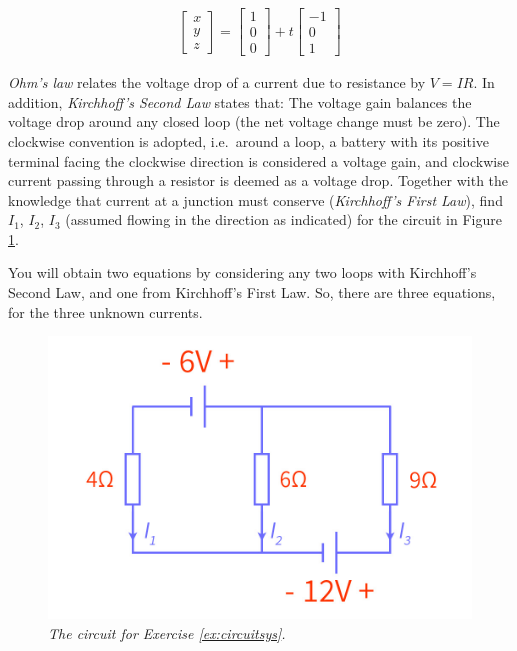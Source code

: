 \begin{Answer}
\begin{align*}
\begin{bmatrix}
x \\
y \\
z 
\end{bmatrix}
=
\begin{bmatrix}
1 \\
0 \\
0
\end{bmatrix}
+
t
\begin{bmatrix}
-1 \\
0 \\
1
\end{bmatrix}
\end{align*}
\end{Answer}

\begin{Exercise}
\label{ex:circuitsys}
\textit{Ohm's law} relates the voltage drop of a current due to resistance by $V=IR$. In addition, \textit{Kirchhoff's Second Law} states that: The voltage gain balances the voltage drop around any closed loop (the net voltage change must be zero). The clockwise convention is adopted, i.e.\ around a loop, a battery with its positive terminal facing the clockwise direction is considered a voltage gain, and clockwise current passing through a resistor is deemed as a voltage drop. Together with the knowledge that current at a junction must conserve (\textit{Kirchhoff's First Law}), find $I_1$, $I_2$, $I_3$ (assumed flowing in the direction as indicated) for the circuit in Figure \ref{fig:circuitsys}. \par
You will obtain two equations by considering any two loops with Kirchhoff's Second Law, and one from Kirchhoff's First Law. So, there are three equations, for the three unknown currents.
\end{Exercise}
\begin{figure}[h!]
\centering
\includegraphics[scale = 0.25]{graphics/circuit.jpg}
\caption{\textit{The circuit for Exercise \ref{ex:circuitsys}.}}
\label{fig:circuitsys}
\end{figure}
